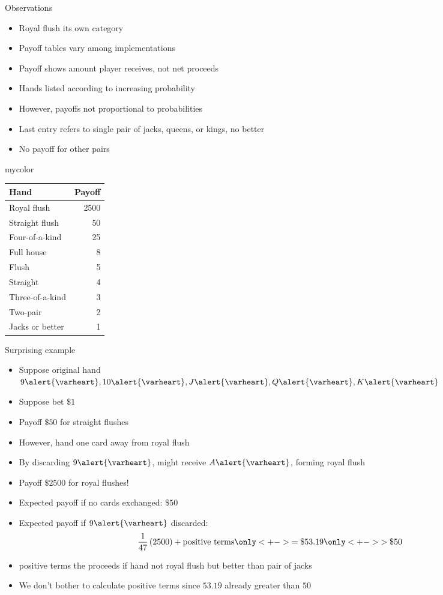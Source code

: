 \documentclass[handout,xcolor=dvipsnames]{beamer}
\theoremstyle{definition}
\newcommand{\hs}{\alert{\varheart}}
\begin{document}
\begin{frame}{Observations}
\begin{multicols}{2}
\begin{itemize}
\item Royal flush its own category
\item Payoff tables vary among implementations
\item Payoff shows amount player receives, not net proceeds
\item Hands listed according to increasing probability
\item However, payoffs not proportional to probabilities
\item Last entry refers to
single pair of jacks, queens, or kings, no better
\item No payoff for other pairs
\end{itemize}
\begin{beamercolorbox}{mycolor}
\begin{tabular}{lr}
Hand&Payoff\\\hline
Royal flush&2500\\
Straight flush&50\\
Four-of-a-kind&25\\
Full house&8\\
Flush&5\\
Straight&4\\
Three-of-a-kind&3\\
Two-pair&2\\
Jacks or better&1
\end{tabular}
\end{beamercolorbox}
\end{multicols}
\end{frame}

\begin{frame}{Surprising example}
\begin{itemize}
\item Suppose original hand $9\hs,10\hs,J\hs,Q\hs,K\hs$
\item Suppose bet $\$1$
\item Payoff $\$50$ for straight flushes
\item However, hand one card away from royal flush
\item By discarding $9\hs$,
might receive $A\hs$, forming royal flush
\item Payoff $\$2500$ for royal flushes!
\item Expected payoff if no cards exchanged: $\$50$
\item Expected payoff if $9\hs$ discarded:
\[\frac{1}{47}\left(2500\right)+\text{positive terms}
\only<+->{=\$53.19}
\only<+->{>\$50}\]
\item \alert{positive terms} the proceeds if
hand not royal flush but better than pair of jacks
\item We don't bother to calculate \alert{positive terms}
since $53.19$ already greater than $50$
\end{itemize}
\end{frame}
\end{document}
